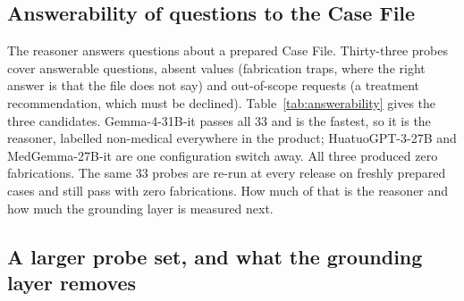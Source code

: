 \documentclass{article}
\begin{document}
\subsection{Answerability of questions to the Case File}

The reasoner answers questions about a prepared Case File. Thirty-three probes cover answerable questions, absent values (fabrication traps, where the right answer is that the file does not say) and out-of-scope requests (a treatment recommendation, which must be declined). Table~\ref{tab:answerability} gives the three candidates. Gemma-4-31B-it passes all 33 and is the fastest, so it is the reasoner, labelled non-medical everywhere in the product; HuatuoGPT-3-27B and MedGemma-27B-it are one configuration switch away. All three produced zero fabrications. The same 33 probes are re-run at every release on freshly prepared cases and still pass with zero fabrications. How much of that is the reasoner and how much the grounding layer is measured next.

\begin{table}[htbp]
\centering\small
\caption{Ask-the-Case-File answerability, 33 probes. Latency is the mean per answer on the H200 at 300\,W; Gemma's figure is after the parallel scope check.}
\label{tab:answerability}

\end{table}

\subsection{A larger probe set, and what the grounding layer removes}
\label{sec:probes}
\end{document}
